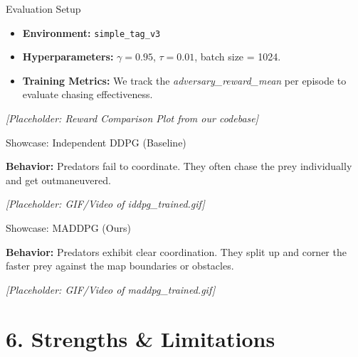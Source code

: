 \documentclass[aspectratio=169]{beamer}
\begin{document}
\begin{frame}{Evaluation Setup}
    \begin{itemize}
        \item \textbf{Environment:} \texttt{simple\_tag\_v3}
        \item \textbf{Hyperparameters:} $\gamma=0.95$, $\tau=0.01$, batch size = 1024.
        \item \textbf{Training Metrics:} We track the \textit{adversary\_reward\_mean} per episode to evaluate chasing effectiveness.
    \end{itemize}
    \begin{center}
        \textit{[Placeholder: Reward Comparison Plot from our codebase]}
    \end{center}
\end{frame}

\begin{frame}{Showcase: Independent DDPG (Baseline)}
    \begin{center}
        \textbf{Behavior:} Predators fail to coordinate. They often chase the prey individually and get outmaneuvered.
        \vspace{0.5cm}
        
        \textit{[Placeholder: GIF/Video of iddpg\_trained.gif]}
    \end{center}
\end{frame}

\begin{frame}{Showcase: MADDPG (Ours)}
    \begin{center}
        \textbf{Behavior:} Predators exhibit clear coordination. They split up and corner the faster prey against the map boundaries or obstacles.
        \vspace{0.5cm}
        
        \textit{[Placeholder: GIF/Video of maddpg\_trained.gif]}
    \end{center}
\end{frame}

\section{6. Strengths \& Limitations}
\end{document}
